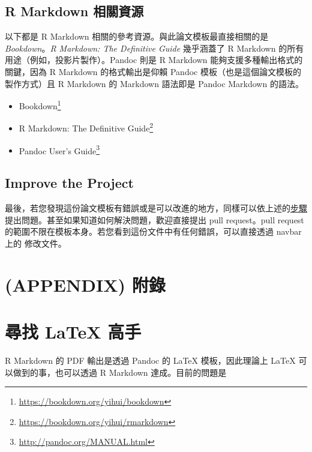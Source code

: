 \documentclass[oneside]{book}
\renewcommand{\href}[2]{#2\footnote{\url{#1}}}
\begin{document}
\hypertarget{rmd-resources}{%
\section*{R Markdown 相關資源}\label{rmd-resources}}

以下都是 R Markdown 相關的參考資源。與此論文模板最直接相關的是 \emph{Bookdown}。\emph{R Markdown: The Definitive Guide} 幾乎涵蓋了 R Markdown 的所有用途（例如，投影片製作）。Pandoc 則是 R Markdown 能夠支援多種輸出格式的關鍵，因為 R Markdown 的格式輸出是仰賴 Pandoc 模板（也是這個論文模板的製作方式）且 R Markdown 的 Markdown 語法即是 Pandoc Markdown 的語法。

\begin{itemize}
\item
  \href{https://bookdown.org/yihui/bookdown}{Bookdown}
\item
  \href{https://bookdown.org/yihui/rmarkdown}{R Markdown: The Definitive Guide}
\item
  \href{http://pandoc.org/MANUAL.html}{Pandoc User's Guide}
\end{itemize}

\hypertarget{improve-the-project}{%
\section*{Improve the Project}\label{improve-the-project}}

最後，若您發現這份論文模板有錯誤或是可以改進的地方，同樣可以依上述的\protect\hyperlink{issue}{步驟}提出問題。甚至如果知道如何解決問題，歡迎直接提出 pull request。pull request 的範圍不限在模板本身。若您看到這份文件中有任何錯誤，可以直接透過 navbar 上的 修改文件。

\hypertarget{appendix-ux9644ux9304}{%
\chapter*{(APPENDIX) 附錄}\label{appendix-ux9644ux9304}}

\hypertarget{latex-cite-pkg}{%
\chapter{尋找 LaTeX 高手}\label{latex-cite-pkg}}

R Markdown 的 PDF 輸出是透過 Pandoc 的 LaTeX 模板，因此理論上 LaTeX 可以做到的事，也可以透過 R Markdown 達成。目前的問題是
\end{document}
